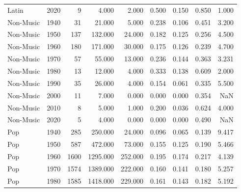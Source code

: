 \begin{table}
{\begin{tabular}{lrrrrrrrr}
                 Latin &           2020 &          9 &    4.000 &    2.000 &        0.500 &  0.150 &  0.850 &                  1.000 \\
             Non-Music &           1940 &         31 &   21.000 &    5.000 &        0.238 &  0.106 &  0.451 &                  3.200 \\
             Non-Music &           1950 &        137 &  132.000 &   24.000 &        0.182 &  0.125 &  0.256 &                  4.500 \\
             Non-Music &           1960 &        180 &  171.000 &   30.000 &        0.175 &  0.126 &  0.239 &                  4.700 \\
             Non-Music &           1970 &         57 &   55.000 &   13.000 &        0.236 &  0.144 &  0.363 &                  3.231 \\
             Non-Music &           1980 &         13 &   12.000 &    4.000 &        0.333 &  0.138 &  0.609 &                  2.000 \\
             Non-Music &           1990 &         35 &   26.000 &    4.000 &        0.154 &  0.061 &  0.335 &                  5.500 \\
             Non-Music &           2000 &         11 &    7.000 &    0.000 &        0.000 &  0.000 &  0.354 &                    NaN \\
             Non-Music &           2010 &          8 &    5.000 &    1.000 &        0.200 &  0.036 &  0.624 &                  4.000 \\
             Non-Music &           2020 &          5 &    4.000 &    0.000 &        0.000 &  0.000 &  0.490 &                    NaN \\
                   Pop &           1940 &        285 &  250.000 &   24.000 &        0.096 &  0.065 &  0.139 &                  9.417 \\
                   Pop &           1950 &        587 &  472.000 &   73.000 &        0.155 &  0.125 &  0.190 &                  5.466 \\
                   Pop &           1960 &       1600 & 1295.000 &  252.000 &        0.195 &  0.174 &  0.217 &                  4.139 \\
                   Pop &           1970 &       1574 & 1389.000 &  222.000 &        0.160 &  0.141 &  0.180 &                  5.257 \\
                   Pop &           1980 &       1585 & 1418.000 &  229.000 &        0.161 &  0.143 &  0.182 &                  5.192 \\

\end{tabular}}
\end{table}
